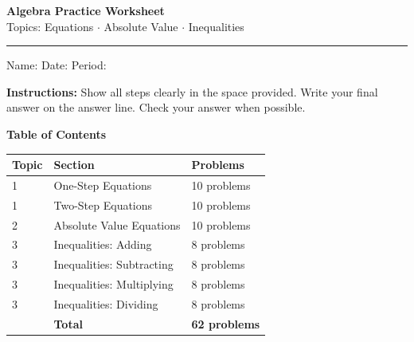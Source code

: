 \documentclass[12pt]{article}
\begin{document}
\begin{center}
  {\LARGE\bfseries Algebra Practice Worksheet}\\[8pt]
  {\large Topics: Equations $\cdot$ Absolute Value $\cdot$ Inequalities}\\[6pt]
  \rule{\textwidth}{1.4pt}
\end{center}

\vspace{6pt}
\noindent
Name:\;\underline{\hspace{6cm}}\quad
Date:\;\underline{\hspace{3cm}}\quad
Period:\;\underline{\hspace{2.2cm}}

\vspace{10pt}

\noindent\textbf{Instructions:} Show all steps clearly in the space provided.
Write your final answer on the answer line. Check your answer when possible.

\vspace{8pt}
\noindent{}

\vspace{10pt}

\noindent\textbf{Table of Contents}
\begin{center}
\renewcommand{\arraystretch}{1.4}
\begin{tabular}{@{}lll@{}}
\toprule
\textbf{Topic} & \textbf{Section} & \textbf{Problems}\\
\midrule
1 & One-Step Equations & 10 problems\\
1 & Two-Step Equations & 10 problems\\
2 & Absolute Value Equations & 10 problems\\
3 & Inequalities: Adding & 8 problems\\
3 & Inequalities: Subtracting & 8 problems\\
3 & Inequalities: Multiplying & 8 problems\\
3 & Inequalities: Dividing & 8 problems\\
\midrule
& \textbf{Total} & \textbf{62 problems}\\
\bottomrule
\end{tabular}
\end{center}
\end{document}
